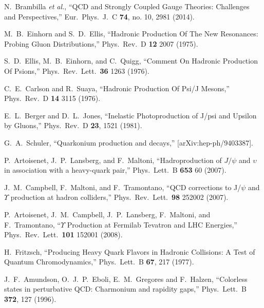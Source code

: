 \documentclass[aps,prc,preprint,superscriptaddress,showpacs,showkeys,amsmath]{revtex4-1}
\begin{document}
\begin{thebibliography}{100}
  N.~Brambilla {\it et al.},
  ``QCD and Strongly Coupled Gauge Theories: Challenges and Perspectives,''
  Eur.\ Phys.\ J.\ C {\bf 74}, no. 10, 2981 (2014).



  M.~B.~Einhorn and S.~D.~Ellis,
  ``Hadronic Production Of The New Resonances: Probing Gluon Distributions,''
  Phys.\ Rev.\  D {\bf 12} 2007 (1975).

  S.~D.~Ellis, M.~B.~Einhorn, and C.~Quigg,
  ``Comment On Hadronic Production Of Psions,''
  Phys.\ Rev.\ Lett.\  {\bf 36} 1263 (1976).

  C.~E.~Carlson and R.~Suaya,
  ``Hadronic Production Of Psi/J Mesons,''
  Phys.\ Rev.\  D {\bf 14} 3115 (1976).
  
  E.~L.~Berger and D.~L.~Jones,
  ``Inelastic Photoproduction of J/psi and Upsilon by Gluons,''
  Phys.\ Rev.\ D {\bf 23}, 1521 (1981).

  G.~A.~Schuler,        
  ``Quarkonium production and decays,''
  [arXiv:hep-ph/9403387].


  P.~Artoisenet, J.~P.~Lansberg, and F.~Maltoni,
  ``Hadroproduction of $J/\psi$ and $\upsilon$ in association with a
  heavy-quark pair,''
  Phys.\ Lett.\  B {\bf 653} 60 (2007).


  J.~M.~Campbell, F.~Maltoni, and F.~Tramontano,
  ``QCD corrections to J/$\psi$ and $\Upsilon$ production at hadron colliders,''
  Phys.\ Rev.\ Lett.\  {\bf 98} 252002 (2007).


  P.~Artoisenet, J.~M.~Campbell, J.~P.~Lansberg, F.~Maltoni, and F.~Tramontano,
  ``$\Upsilon$ Production at Fermilab Tevatron and LHC Energies,''
  Phys.\ Rev.\ Lett.\  {\bf 101} 152001 (2008).
  

  H.~Fritzsch,
  ``Producing Heavy Quark Flavors in Hadronic Collisions: A Test of Quantum Chromodynamics,''
  Phys.\ Lett.\ B {\bf 67}, 217 (1977).
  
  J.~F.~Amundson, O.~J.~P.~Eboli, E.~M.~Gregores and F.~Halzen,
  ``Colorless states in perturbative QCD: Charmonium and rapidity gaps,''
  Phys.\ Lett.\ B {\bf 372}, 127 (1996).



\end{thebibliography}
\end{document}
